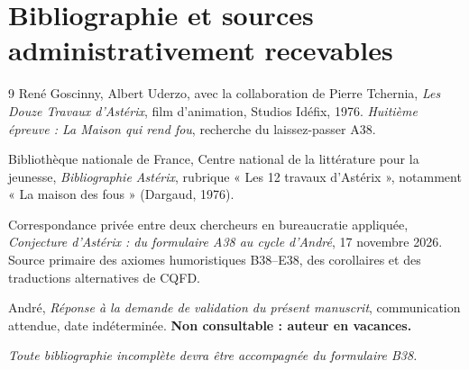 \documentclass[11pt,a4paper]{article}
\theoremstyle{remark}\newtheorem*{remarque}{Remarque}
\begin{document}
\section{Bibliographie et sources administrativement recevables}
\begin{thebibliography}{9}
René Goscinny, Albert Uderzo, avec la collaboration de Pierre Tchernia,
\emph{Les Douze Travaux d'Astérix}, film d'animation, Studios Idéfix, 1976.
\emph{Huitième épreuve : La Maison qui rend fou}, recherche du laissez-passer A38.

Bibliothèque nationale de France, Centre national de la littérature pour la jeunesse,
\emph{Bibliographie Astérix}, rubrique « Les 12 travaux d'Astérix »,
notamment « La maison des fous » (Dargaud, 1976).

Correspondance privée entre deux chercheurs en bureaucratie appliquée,
\emph{Conjecture d'Astérix : du formulaire A38 au cycle d'André},
17 novembre 2026. Source primaire des axiomes humoristiques B38--E38,
des corollaires et des traductions alternatives de CQFD.

André, \emph{Réponse à la demande de validation du présent manuscrit},
communication attendue, date indéterminée. \textbf{Non consultable : auteur en vacances.}
\end{thebibliography}
\begin{center}
\textit{Toute bibliographie incomplète devra être accompagnée du formulaire B38.}
\end{center}
\end{document}
